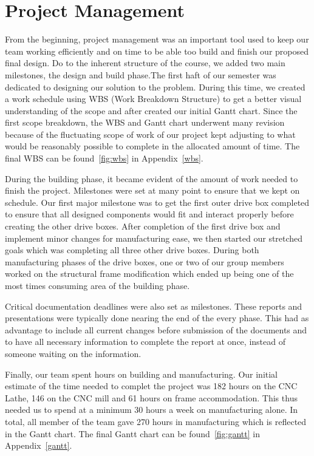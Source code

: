 \section{Project Management}

From the beginning, project management was an important tool used to keep our team working efficiently and on time  to be able too build and finish our proposed final design. Do to the inherent structure of the course, we added two main milestones, the design and build phase.The first haft of our semester was dedicated to designing our solution to the problem. During this time, we created a work schedule using WBS (Work Breakdown Structure) to get a better visual understanding of the scope and after created our initial Gantt chart. Since the first scope breakdown, the WBS and Gantt chart underwent many revision because of the fluctuating scope of work of our project kept adjusting to what would be reasonably possible to complete in the allocated amount of time. The final WBS can be found~\ref{fig:wbs} in Appendix~\ref{wbs}.

During the building phase, it became evident of the amount of work needed to finish the project. Milestones were set at many point to ensure that we kept on schedule. Our first major milestone was to get the first outer drive box completed to ensure that all designed components would fit and interact properly before creating the other drive boxes. After completion of the first drive box and implement minor changes for manufacturing ease, we then started our stretched goals which was completing all three other drive boxes. During both manufacturing phases of the drive boxes, one or two of our group members worked on the structural frame modification which ended up being one of the most times consuming area of the building phase. 

Critical documentation deadlines were also set as milestones. These reports and presentations were typically done nearing the end of the every phase. This had as advantage to include all current changes before submission of the documents and to have all necessary information to complete the report at once, instead of someone waiting on the information. 

Finally, our team spent hours on building and manufacturing. Our initial estimate of the time needed to complet the project was 182 hours on the CNC Lathe, 146 on the CNC mill and 61 hours on frame accommodation. This thus needed us to spend at a minimum 30 hours a week on manufacturing alone. In total, all member of the team gave 270 hours in manufacturing which is reflected in the Gantt chart. The final Gantt chart can be found~\ref{fig:gantt} in Appendix~\ref{gantt}.